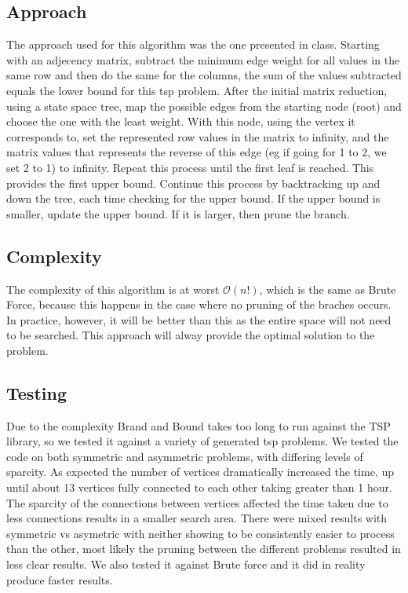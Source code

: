\documentclass[11pt, english]{article}
\begin{document}
\subsection{Approach}
The approach used for this algorithm was the one presented in class. Starting with an adjecency matrix, subtract the minimum edge weight for all values in the same row and then do the same for the columns, the sum of the values subtracted equals the lower bound for this tsp problem. After the initial matrix reduction, using a state space tree, map the possible edges from the starting node (root) and choose the one with the least weight. With this node, using the vertex it corresponds to, set the represented row values in the matrix to infinity, and the matrix values that represents the reverse of this edge (eg if going for 1 to 2, we set 2 to 1) to infinity. Repeat this process until the first leaf is reached. This provides the first upper bound. 
Continue this process by backtracking up and down the tree, each time checking for the upper bound. If the upper bound is smaller, update the upper bound. If it is larger, then prune the branch.

\subsection{Complexity}
\noindent
The complexity of this algorithm is at worst $\mathcal{O}(n!)$, which is the same as Brute Force, because this happens in the case where no pruning of the braches occurs. In practice, however, it will be better than this as the entire space will not need to be searched. This approach will alway provide the optimal solution to the problem.

\subsection{Testing}
Due to the complexity Brand and Bound takes too long to run against the TSP library, so we tested it against a variety of generated tsp problems. We tested the code on both symmetric and asymmetric problems, with differing levels of sparcity. As expected the number of vertices dramatically increased the time, up until about 13 vertices fully connected to each other taking greater than 1 hour. \newline 
The sparcity of the connections between vertices affected the time taken due to less connections results in a smaller search area. There were mixed results with symmetric vs asymetric with neither showing to be consistently easier to process than the other, most likely the pruning between the different problems resulted in less clear results. We also tested it against Brute force and it did in reality produce faster results.
\end{document}
